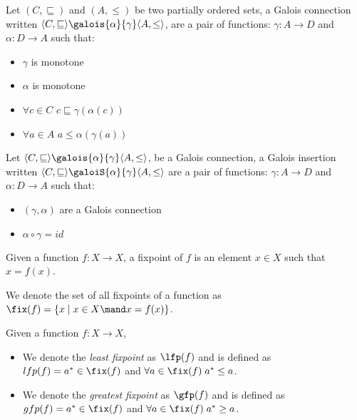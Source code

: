 \begin{definition}
  Let $(C, \sqsubseteq)$ and $(A, \leq)$ be two partially ordered sets, a 
  Galois connection written $\langle C, \sqsubseteq \rangle 
  \galois{\alpha}{\gamma} \langle A, \leq \rangle$, are a pair of functions:
  $\gamma : A \to D$ and $\alpha : D \to A$ such that:
  \begin{itemize}
    \item $\gamma$ is monotone
    \item $\alpha$ is monotone
    \item $\forall c \in C$ $c \sqsubseteq \gamma(\alpha(c))$
    \item $\forall a \in A$ $a \leq \alpha(\gamma(a))$
  \end{itemize}
\end{definition}

\begin{definition}
  Let $\langle C, \sqsubseteq \rangle \galois{\alpha}{\gamma} \langle A, \leq 
  \rangle$, be a Galois connection, a Galois insertion written 
  $\langle C, \sqsubseteq \rangle \galoiS{\alpha}{\gamma} \langle A, \leq \rangle$
  are a pair of functions: $\gamma : A \to D$ and $\alpha : D \to A$ such that:
  \begin{itemize}
    \item $(\gamma, \alpha)$ are a Galois connection
    \item $\alpha \circ \gamma = id$
  \end{itemize}
\end{definition}

\begin{definition}[Fixpoint]
  Given a function $f : X \to X$, a fixpoint of $f$ is an element $x \in X$ 
  such that $x = f(x)$.

  We denote the set of all fixpoints of a function as $\fix(f) = 
  \{ x \mid x \in X \mand x = f(x) \}$.
\end{definition}

\begin{definition}
  Given a function $f : X \to X$,
  \begin{itemize}
    \item We denote the \textit{least fixpoint} as $\lfp(f)$ and is defined as
      $lfp(f) = a^* \in \fix(f)$ and $\forall a \in \fix(f) \; a^* \leq a$.
    \item We denote the \textit{greatest fixpoint} as $\gfp(f)$ and is defined as
      $gfp(f) = a^* \in \fix(f)$ and $\forall a \in \fix(f) \; a^* \geq a$.
  \end{itemize}
\end{definition}

